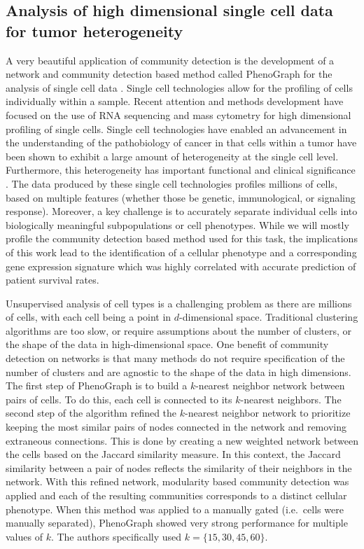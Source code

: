 \subsection{Analysis of high dimensional single cell data for tumor heterogeneity}
\indent A very beautiful application of community detection is the development of a network and community detection based method called PhenoGraph for the analysis of single cell data \cite{phenoGraph}. Single cell technologies allow for the profiling of cells individually within a sample. Recent attention and methods development have focused on the use of RNA sequencing and mass cytometry for high dimensional profiling of single cells. Single cell technologies have enabled an advancement in the understanding of the pathobiology of cancer in that cells within a tumor have been shown to exhibit a large amount of heterogeneity at the single cell level. Furthermore, this heterogeneity has important functional and clinical significance \cite{intraTumor}. The data produced by these single cell technologies profiles millions of cells, based on multiple features (whether those be genetic, immunological, or signaling response). Moreover, a key challenge is to accurately separate individual cells into biologically meaningful subpopulations or cell phenotypes. While we will mostly profile the community detection based method used for this task, the implications of this work lead to the identification of a cellular phenotype and a corresponding gene expression signature which was highly correlated with accurate prediction of patient survival rates. 

\indent Unsupervised analysis of cell types is a challenging problem as there are millions of cells, with each cell being a point in $d$-dimensional space. Traditional clustering algorithms are too slow, or require assumptions about the number of clusters, or the shape of the data in high-dimensional space. One benefit of community detection on networks is that many methods do not require specification of the number of clusters and are agnostic to the shape of the data in high dimensions. The first step of PhenoGraph is to build a $k$-nearest neighbor network between pairs of cells. To do this, each cell is connected to its $k$-nearest neighbors. The second step of the algorithm refined the $k$-nearest neighbor network to prioritize keeping the most similar pairs of nodes connected in the network and removing extraneous connections. This is done by creating a new weighted network between the cells based on the Jaccard similarity measure. In this context, the Jaccard similarity between a pair of nodes reflects the similarity of their neighbors in the network. With this refined network, modularity based community detection was applied and each of the resulting communities corresponds to a distinct cellular phenotype. When this method was applied to a manually gated (i.e.~cells were manually separated), PhenoGraph showed very strong performance for multiple values of $k$. The authors specifically used $k=\{15,30,45,60\}$. 

